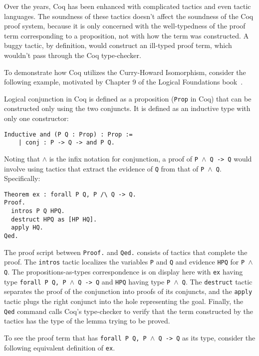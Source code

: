 \documentclass{article}
\begin{document}
	Over the years, Coq has been enhanced 
	with complicated tactics and even 
	tactic languages. The soundness of 
	these tactics doesn't affect the 
	soundness of the Coq proof system, 
	because it is only concerned with 
	the well-typedness of the proof 
	term corresponding to a proposition,
	not with how the term was constructed. 
	A buggy tactic, by definition, would 
	construct an ill-typed proof term,
	which wouldn't pass through the 
	Coq type-checker.
	
	To demonstrate how Coq utilizes 
	the Curry-Howard Isomorphism, 
	consider the following example, 
	motivated by Chapter 9 of the 
	Logical Foundations 
	book~\cite{Pierce:SF1}.
	
	Logical conjunction in Coq is 
	defined as a proposition 
	(\texttt{Prop} in Coq) that 
	can be constructed only using 
	the two conjuncts. It is defined
	as an inductive type with 
	only one constructor:
	\begin{verbatim}
Inductive and (P Q : Prop) : Prop :=
	| conj : P -> Q -> and P Q.
	\end{verbatim}
	
	Noting that $\land$ is the infix 
	notation for conjunction, 
	a proof of \texttt{P $\land$ Q -> Q} 
	would involve using tactics that
	extract the evidence of \texttt{Q}
	from that of \texttt{P $\land$ Q}.
	Specifically:
	\begin{verbatim}
Theorem ex : forall P Q, P /\ Q -> Q.
Proof.
  intros P Q HPQ. 
  destruct HPQ as [HP HQ].
  apply HQ.
Qed.
	\end{verbatim}
	The proof script between 
	\texttt{Proof.} and \texttt{Qed.}
	consists of tactics that complete 
	the proof. The \texttt{intros}
	tactic localizes the variables 
	\texttt{P} and \texttt{Q} and 
	evidence \texttt{HPQ} for 
	\texttt{P $\land$ Q}. The 
	propositions-as-types correspondence
	is on display here with \texttt{ex}
	having type 
	\texttt{forall P Q, P $\land$ Q -> Q}
	and \texttt{HPQ} having type
	\texttt{P $\land$ Q}. The 
	\texttt{destruct} tactic separates 
	the proof of the conjunction into 
	proofs of its conjuncts, and the 
	\texttt{apply} tactic plugs the 
	right conjunct into the hole 
	representing the goal. Finally,
	the \texttt{Qed} command calls 
	Coq's type-checker to verify that 
	the term constructed by the 
	tactics has the type of the 
	lemma trying to be proved.
	
	To see the proof term that has 
	\texttt{forall P Q, P $\land$ Q -> Q}
	as its type, consider the following
	equivalent definition of \texttt{ex}.
	
\end{document}
